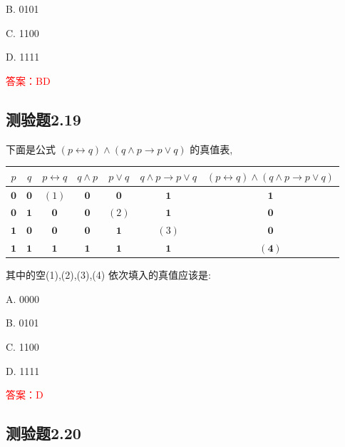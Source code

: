\documentclass[UTF8, heading=true]{ctexart}
\begin{document}
B. 0101

C. 1100

D. 1111

\textcolor{red}{答案：BD}

\subsection{测验题2.19}

下面是公式 $(p \leftrightarrow q) \wedge(q \wedge p \rightarrow p \vee q)$ 的真值表,


\begin{table}[H]
\centering
\begin{tabular}{c|c|c|c|c|c|c}
\hline$p$ & $q$ & $p \leftrightarrow q$ & $q \wedge p$ & $p \vee q$ & $q \wedge p \rightarrow p \vee q$ & $(p \leftrightarrow q) \wedge(q \wedge p \rightarrow p \vee q)$ \\
\hline $\mathbf{0}$ & $\mathbf{0}$ & $(1)$ & $\mathbf{0}$ & $\mathbf{0}$ & $\mathbf{1}$ & $\mathbf{1}$ \\
\hline $\mathbf{0}$ & $\mathbf{1}$ & $\mathbf{0}$ & $\mathbf{0}$ & $(2)$ & $\mathbf{1}$ & $\mathbf{0}$ \\
\hline $\mathbf{1}$ & $\mathbf{0}$ & $\mathbf{0}$ & $\mathbf{0}$ & $\mathbf{1}$ & $(3)$ & $\mathbf{0}$ \\
\hline $\mathbf{1}$ & $\mathbf{1}$ & $\mathbf{1}$ & $\mathbf{1}$ & $\mathbf{1}$ & $\mathbf{1}$ & $\mathbf{( 4 )}$ \\
\hline
\end{tabular}
\end{table}

其中的空(1),(2),(3),(4) 依次填入的真值应该是:

A. 0000

B. 0101

C. 1100

D. 1111

\textcolor{red}{答案：D}

\subsection{测验题2.20}
\end{document}
